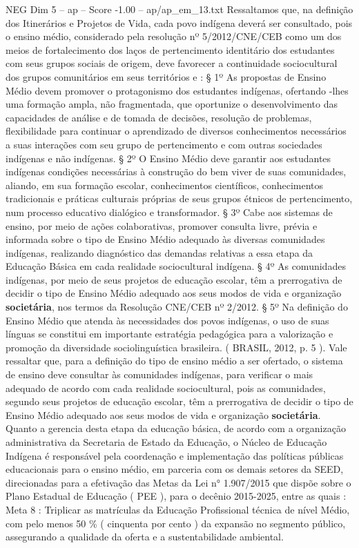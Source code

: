 \begin{textsample}{NEG Dim 5 – ap – Score -1.00 – ap/ap\_em\_13.txt}
Ressaltamos que, na definição dos Itinerários e Projetos de Vida, cada povo indígena deverá ser consultado, pois o ensino médio, considerado pela resolução nº 5/2012/CNE/CEB como um dos meios de fortalecimento dos laços de pertencimento identitário dos estudantes com seus grupos sociais de origem, deve favorecer a continuidade sociocultural dos grupos comunitários em seus territórios e : § 1º As propostas de Ensino Médio devem promover o protagonismo dos estudantes indígenas, ofertando -lhes uma formação ampla, não fragmentada, que oportunize o desenvolvimento das capacidades de análise e de tomada de decisões, resolução de problemas, flexibilidade para continuar o aprendizado de diversos conhecimentos necessários a suas interações com seu grupo de pertencimento e com outras sociedades indígenas e não indígenas. § 2º O Ensino Médio deve garantir aos estudantes indígenas condições necessárias à construção do bem viver de suas comunidades, aliando, em sua formação escolar, conhecimentos científicos, conhecimentos tradicionais e práticas culturais próprias de seus grupos étnicos de pertencimento, num processo educativo dialógico e transformador. § 3º Cabe aos sistemas de ensino, por meio de ações colaborativas, promover consulta livre, prévia e informada sobre o tipo de Ensino Médio adequado às diversas comunidades indígenas, realizando diagnóstico das demandas relativas a essa etapa da Educação Básica em cada realidade sociocultural indígena. § 4º As comunidades indígenas, por meio de seus projetos de educação escolar, têm a prerrogativa de decidir o tipo de Ensino Médio adequado aos seus modos de vida e organização \textbf{societária}, nos termos da Resolução CNE/CEB nº 2/2012. § 5º Na definição do Ensino Médio que atenda às necessidades dos povos indígenas, o uso de suas línguas se constitui em importante estratégia pedagógica para a valorização e promoção da diversidade sociolinguística brasileira. ( BRASIL, 2012, p. 5 ).
Vale ressaltar que, para a definição do tipo de ensino médio a ser ofertado, o sistema de ensino deve consultar às comunidades indígenas, para verificar o mais adequado de acordo com cada realidade sociocultural, pois as comunidades, segundo seus projetos de educação escolar, têm a prerrogativa de decidir o tipo de Ensino Médio adequado aos seus modos de vida e organização \textbf{societária}.
Quanto a gerencia desta etapa da educação básica, de acordo com a organização administrativa da Secretaria de Estado da Educação, o Núcleo de Educação Indígena é responsável pela coordenação e implementação das políticas públicas educacionais para o ensino médio, em parceria com os demais setores da SEED, direcionadas para a efetivação das Metas da Lei n{\EmojiFont °} 1.907/2015 que dispõe sobre o Plano Estadual de Educação ( PEE ), para o decênio 2015-2025, entre as quais : Meta 8 : Triplicar as matrículas da Educação Profissional técnica de nível Médio, com pelo menos 50 \% ( cinquenta por cento ) da expansão no segmento público, assegurando a qualidade da oferta e a sustentabilidade ambiental.

\end{textsample}
